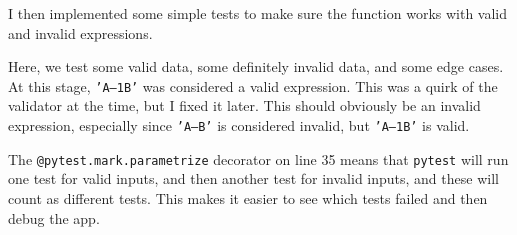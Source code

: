 \documentclass[../main.tex]{subfiles}
\begin{document}

I then implemented some simple tests to make sure the function works with valid and invalid expressions.


Here, we test some valid data, some definitely invalid data, and some edge cases. At this stage, \texttt{'A--1B'} was considered a valid expression. This was a quirk of the validator at the time, but I fixed it later. This should obviously be an invalid expression, especially since \texttt{'A--B'} is considered invalid, but \texttt{'A--1B'} is valid.

The \texttt{@pytest.mark.parametrize} decorator on line 35 means that \texttt{pytest} will run one test for valid inputs, and then another test for invalid inputs, and these will count as different tests. This makes it easier to see which tests failed and then debug the app.
\end{document}
